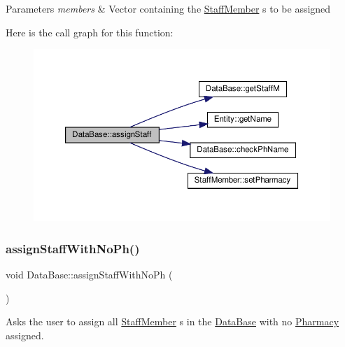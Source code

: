 \begin{DoxyParams}{Parameters}
{\em members} & Vector containing the \hyperlink{classStaffMember}{Staff\+Member} \textquotesingle{}s to be assigned \\
\hline
\end{DoxyParams}
Here is the call graph for this function\+:\nopagebreak
\begin{figure}[H]
\begin{center}
\leavevmode
\includegraphics[width=350pt]{classDataBase_aecde8e08249b522ff9431c9feed57996_cgraph}
\end{center}
\end{figure}
\mbox{\label{classDataBase_a28237a8f74d11c092cf250d17c7997f1}} 
\subsubsection{\texorpdfstring{assign\+Staff\+With\+No\+Ph()}{assignStaffWithNoPh()}}
{\footnotesize\ttfamily void Data\+Base\+::assign\+Staff\+With\+No\+Ph (\begin{DoxyParamCaption}{ }\end{DoxyParamCaption})}



Asks the user to assign all \hyperlink{classStaffMember}{Staff\+Member} \textquotesingle{}s in the \hyperlink{classDataBase}{Data\+Base} with no \hyperlink{classPharmacy}{Pharmacy} assigned. 

